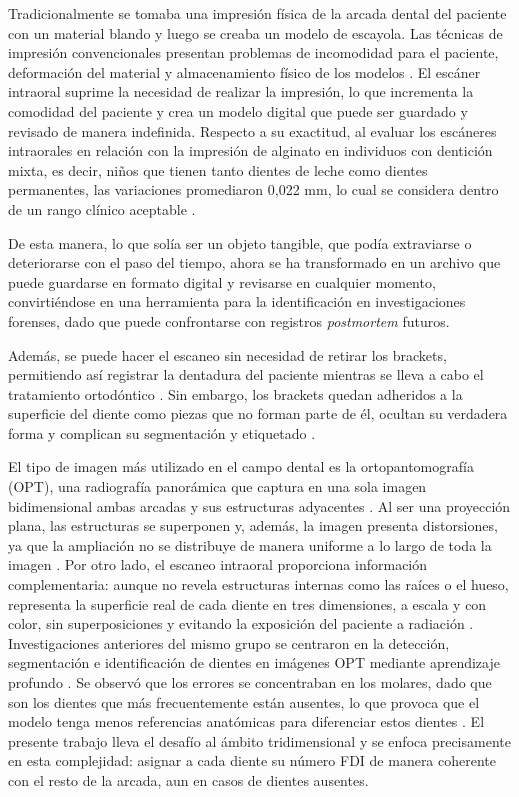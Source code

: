 Tradicionalmente se tomaba una impresión física de la arcada dental del paciente con un material blando y luego se creaba un modelo de escayola. Las técnicas de impresión convencionales 
presentan problemas de incomodidad para el paciente, deformación del material y almacenamiento físico de los modelos \cite{leeClinicalApplicationIntraoral2024}. El escáner intraoral 
suprime la necesidad de realizar la impresión, lo que incrementa la comodidad del paciente y crea un modelo digital que puede ser guardado y revisado de manera indefinida.
Respecto a su exactitud, al evaluar los escáneres intraorales en relación con la impresión de alginato en individuos con dentición mixta, es decir, niños que tienen tanto dientes de leche 
como dientes permanentes, las variaciones promediaron 0,022 mm, lo cual se considera dentro de un rango clínico aceptable \cite{leeClinicalApplicationIntraoral2024}.

De esta manera, lo que solía ser un objeto tangible, que podía extraviarse o deteriorarse con el paso del tiempo, ahora se ha transformado en un archivo que puede guardarse en formato
digital y revisarse en cualquier momento, convirtiéndose en una herramienta para la identificación en investigaciones forenses, dado que puede confrontarse con registros
\textit{postmortem} futuros.

Además, se puede hacer el escaneo sin necesidad de retirar los brackets, permitiendo así registrar la dentadura del paciente mientras se lleva a cabo el tratamiento ortodóntico
\cite{leeClinicalApplicationIntraoral2024}. Sin embargo, los brackets quedan adheridos a la superficie del diente como piezas que no forman parte de él, ocultan su verdadera forma y 
complican su segmentación y etiquetado \cite{ben-hamadou3DTeethSeg223DTeeth2023}.

El tipo de imagen más utilizado en el campo dental es la ortopantomografía (OPT), una radiografía panorámica que captura en una sola imagen bidimensional ambas arcadas
y sus estructuras adyacentes \cite{barcoDeteccionSegmentacion2025}. Al ser una proyección plana, las estructuras se superponen y, además, la imagen presenta distorsiones, ya que la 
ampliación no se distribuye de manera uniforme a lo largo de toda la imagen \cite{barcoDeteccionSegmentacion2025}. Por otro lado, el escaneo intraoral proporciona información 
complementaria: aunque no revela estructuras internas como las raíces o el hueso, representa la superficie real de cada diente en tres dimensiones, a escala y con color, sin superposiciones
y evitando la exposición del paciente a radiación \cite{forrestForensicOdontologyDVI2019}. Investigaciones anteriores del mismo grupo se centraron en la detección, segmentación e 
identificación de dientes en imágenes OPT mediante aprendizaje profundo \cite{barcoDeteccionSegmentacion2025}. Se observó que los errores se concentraban en los molares, dado que son los 
dientes que más frecuentemente están ausentes, lo que provoca que el modelo tenga menos referencias anatómicas para diferenciar estos dientes \cite{barcoDeteccionSegmentacion2025}. 
El presente trabajo lleva el desafío al ámbito tridimensional y se enfoca precisamente en esta complejidad: asignar a cada diente su número FDI de manera coherente con el resto de la 
arcada, aun en casos de dientes ausentes.

